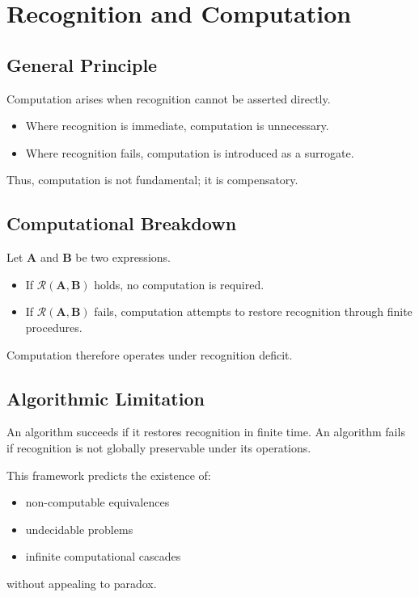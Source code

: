 \documentclass[12pt, oneside]{article}
\newcommand{\R}{\mathcal{R}}
\begin{document}
\section{Recognition and Computation}

\subsection{General Principle}

Computation arises when recognition cannot be asserted directly.
\begin{itemize}
    \item Where recognition is immediate, computation is unnecessary.
    \item Where recognition fails, computation is introduced as a surrogate.
\end{itemize}
Thus, computation is not fundamental; it is compensatory.

\subsection{Computational Breakdown}

Let $\mathbf{A}$ and $\mathbf{B}$ be two expressions.
\begin{itemize}
    \item If $\R(\mathbf{A},\mathbf{B})$ holds, no computation is required.
    \item If $\R(\mathbf{A},\mathbf{B})$ fails, computation attempts to restore recognition through finite procedures.
\end{itemize}
Computation therefore operates under recognition deficit.

\subsection{Algorithmic Limitation}

An algorithm succeeds if it restores recognition in finite time. An algorithm fails if recognition is not globally preservable under its operations.

This framework predicts the existence of:
\begin{itemize}
    \item non-computable equivalences
    \item undecidable problems
    \item infinite computational cascades
\end{itemize}
without appealing to paradox.
\end{document}
